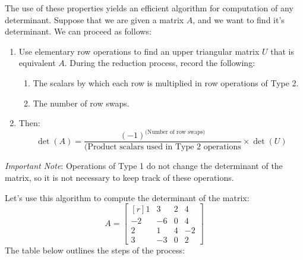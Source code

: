 \documentclass[12pt]{article}
\begin{document}
The use of these properties yields an efficient algorithm for computation of any determinant. Suppose that we are given a matrix $A$, and we want to find it's determinant. We can proceed as follows:

\begin{enumerate}
\item Use elementary row operations to find an upper triangular matrix $U$ that is equivalent $A$. During the reduction process, record the following:
\begin{enumerate}
\item The scalars by which each row is multiplied in row operations of Type 2.
\item The number of row swaps.
\end{enumerate}
\item Then:
\[
\det(A)=\frac{(-1)^{\text{(Number of row swaps)}}}
{\text{(Product scalars used in Type 2 operations}}\times \det(U)
\]
\end{enumerate}

\emph{Important Note}: Operations of Type 1 do not change the determinant of the matrix, so it is not necessary to keep track of these operations.

Let's use this algorithm to compute the determinant of the matrix:
\[
A = \left[\begin{matrix*}[r]1 & 3 & 2 & 4\\-2 & -6 & 0 & 4\\2 & 1 & 4 & -2\\3 & -3 & 0 & 2\end{matrix*}\right]
\]
The table below outlines the steps of the process:
\end{document}
